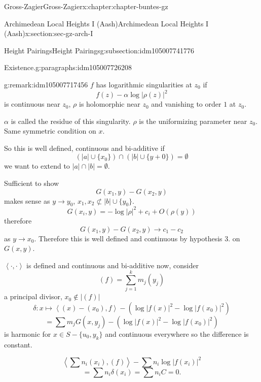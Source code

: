 \documentclass[oneside,10pt,]{book}
\numberwithin{equation}{section}
\newcommand{\pair}[2]{\left\langle #1, #2 \right\rangle}
\begin{document}
\begin{chapterptx}{Gross-Zagier}{}{Gross-Zagier}{}{}{x:chapter:chapter-buntes-gz}
\begin{sectionptx}{Archimedean Local Heights I (Aash)}{}{Archimedean Local Heights I (Aash)}{}{}{x:section:sec-gz-arch-I}
\begin{subsectionptx}{Height Pairings}{}{Height Pairings}{}{}{g:subsection:idm105007741776}
\begin{paragraphs}{Existence.}{g:paragraphs:idm105007726208}
\begin{remark}{}{g:remark:idm105007717456}
\(f\) has logarithmic singularities at \(z_0\) if%
\begin{equation*}
f(z) - \alpha \log|\rho (z)|^2
\end{equation*}
is continuous near \(z_0\), \(\rho \) is holomorphic near \(z_0\) and vanishing to order \(1\) at \(z_0\).%
\par
\(\alpha \) is called the residue of this singularity. \(\rho \) is the uniformizing parameter near \(z_0\). Same symmetric condition on \(x\).%
\end{remark}
So this is well defined, continuous and bi-additive if%
\begin{equation*}
(|a| \cup\{x_0\}) \cap (|b| \cup \{y+0\} ) = \emptyset
\end{equation*}
we want to extend to \(|a|\cap |b| = \emptyset\).%
\par
Sufficient to show%
\begin{equation*}
G(x_1,y) -G(x_2,y)
\end{equation*}
makes sense as \(y\to y_0\), \(x_1, x_2 \not \subset |b| \cup\{y_0\}\).%
\begin{equation*}
G(x_i, y) = - \log|\rho |^2 + c_i + O(\rho (y))
\end{equation*}
therefore%
\begin{equation*}
G(x_1,y) - G(x_2,y) \to c_1  - c_2
\end{equation*}
as \(y \to x_0\). Therefore this is well defined and continuous by hypothesis 3. on \(G(x,y)\).%
\par
\(\pair\cdot\cdot\) is defined and continuous and bi-additive now, consider%
\begin{equation*}
(f) = \sum_{j=1}^ k m_j (y_j)
\end{equation*}
a principal divisor, \(x_0 \not \in |(f)|\)%
\begin{equation*}
\delta \colon x\mapsto \pair {(x) - (x_0) }{f} - \left(\log|f(x)|^2 - \log|f(x_0)|^2\right)
\end{equation*}
%
\begin{equation*}
= \sum m_j G(x,y_j) - \left( \log|f(x)| ^2 - \log|f(x_0)|^2\right)
\end{equation*}
is harmonic for \(x \in S - \{u_0, y_k\}\) and continuous everywhere so the difference is constant.%
\par
%
\begin{equation*}
\pair {\sum n_i(x_i)}{(f)} - \sum n_i \log|f(x_i)|^2
\end{equation*}
%
\begin{equation*}
=\sum n_i \delta (x_i) = \sum n_i C = 0\text{.}

\end{equation*}
\end{paragraphs}
\end{subsectionptx}
\end{sectionptx}
\end{chapterptx}
\end{document}
